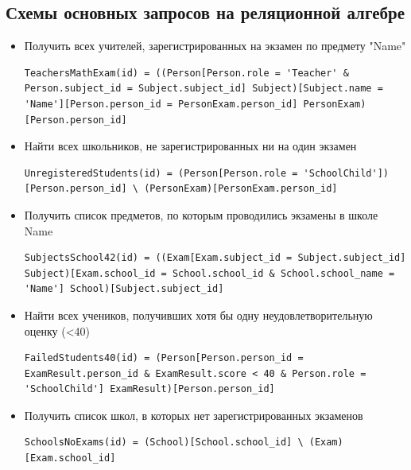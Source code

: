 \documentclass[a4paper]{article}
\begin{document}
\subsection{Схемы основных запросов на реляционной алгебре}

\begin{itemize}
      \item Получить всех учителей, зарегистрированных на экзамен по предмету "Name"
            \begin{lstlisting}[basicstyle=\ttfamily\small, breaklines=true, frame=none, numbers=none]
TeachersMathExam(id) = ((Person[Person.role = 'Teacher' & Person.subject_id = Subject.subject_id] Subject)[Subject.name = 'Name'][Person.person_id = PersonExam.person_id] PersonExam)[Person.person_id]
\end{lstlisting}

      \item Найти всех школьников, не зарегистрированных ни на один экзамен
            \begin{lstlisting}[basicstyle=\ttfamily\small, breaklines=true, frame=none, numbers=none]
UnregisteredStudents(id) = (Person[Person.role = 'SchoolChild'])[Person.person_id] \ (PersonExam)[PersonExam.person_id]
\end{lstlisting}

      \item Получить список предметов, по которым проводились экзамены в школе Name
            \begin{lstlisting}[basicstyle=\ttfamily\small, breaklines=true, frame=none, numbers=none]
SubjectsSchool42(id) = ((Exam[Exam.subject_id = Subject.subject_id] Subject)[Exam.school_id = School.school_id & School.school_name = 'Name'] School)[Subject.subject_id]
\end{lstlisting}

      \item Найти всех учеников, получивших хотя бы одну неудовлетворительную оценку (<40)
            \begin{lstlisting}[basicstyle=\ttfamily\small, breaklines=true, frame=none, numbers=none]
FailedStudents40(id) = (Person[Person.person_id = ExamResult.person_id & ExamResult.score < 40 & Person.role = 'SchoolChild'] ExamResult)[Person.person_id]
\end{lstlisting}

      \item Получить список школ, в которых нет зарегистрированных экзаменов
            \begin{lstlisting}[basicstyle=\ttfamily\small, breaklines=true, frame=none, numbers=none]
SchoolsNoExams(id) = (School)[School.school_id] \ (Exam)[Exam.school_id]
\end{lstlisting}


\end{itemize}
\end{document}
